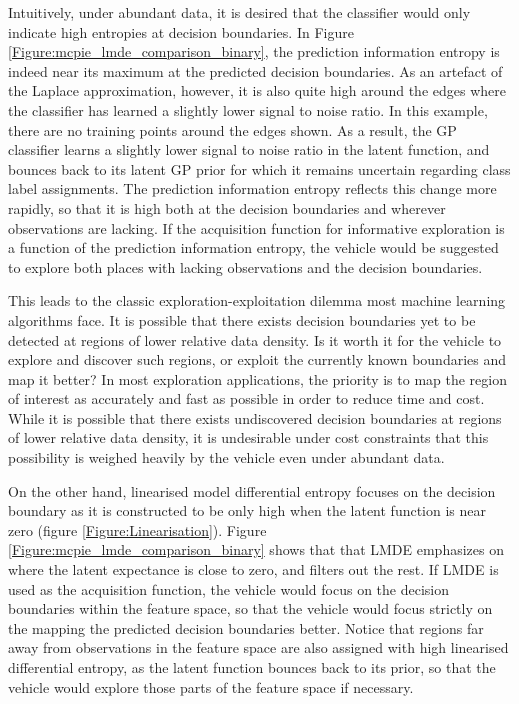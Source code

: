 			Intuitively, under abundant data, it is desired that the classifier would only indicate high entropies at decision boundaries. In Figure \ref{Figure:mcpie_lmde_comparison_binary}, the prediction information entropy is indeed near its maximum at the predicted decision boundaries. As an artefact of the Laplace approximation, however, it is also quite high around the edges where the classifier has learned a slightly lower signal to noise ratio. In this example, there are no training points around the edges shown. As a result, the GP classifier learns a slightly lower signal to noise ratio in the latent function, and bounces back to its latent GP prior for which it remains uncertain regarding class label assignments. The prediction information entropy reflects this change more rapidly, so that it is high both at the decision boundaries and wherever observations are lacking. If the acquisition function for informative exploration is a function of the prediction information entropy, the vehicle would be suggested to explore both places with lacking observations and the decision boundaries. 
	
			This leads to the classic exploration-exploitation dilemma most machine learning algorithms face. It is possible that there exists decision boundaries yet to be detected at regions of lower relative data density. Is it worth it for the vehicle to explore and discover such regions, or exploit the currently known boundaries and map it better? In most exploration applications, the priority is to map the region of interest as accurately and fast as possible in order to reduce time and cost. While it is possible that there exists undiscovered decision boundaries at regions of lower relative data density, it is undesirable under cost constraints that this possibility is weighed heavily by the vehicle even under abundant data.
					
			On the other hand, linearised model differential entropy focuses on the decision boundary as it is constructed to be only high when the latent function is near zero (figure \ref{Figure:Linearisation}). Figure \ref{Figure:mcpie_lmde_comparison_binary} shows that that LMDE emphasizes on where the latent expectance is close to zero, and filters out the rest. If LMDE is used as the acquisition function, the vehicle would focus on the decision boundaries within the feature space, so that the vehicle would focus strictly on the mapping the predicted decision boundaries better. Notice that regions far away from observations in the feature space are also assigned with high linearised differential entropy, as the latent function bounces back to its prior, so that the vehicle would explore those parts of the feature space if necessary.
			
